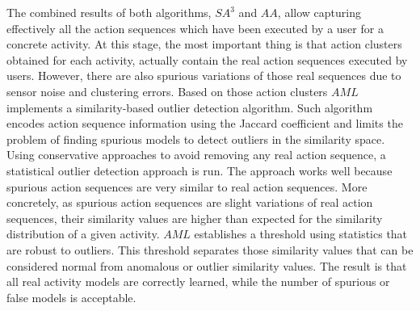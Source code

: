 The combined results of both algorithms, $SA^3$ and $AA$, allow capturing effectively all the action sequences which have been executed by a user for a concrete activity. At this stage, the most important thing is that action clusters obtained for each activity, actually contain the real action sequences executed by users. However, there are also spurious variations of those real sequences due to sensor noise and clustering errors. Based on those action clusters $AML$ implements a similarity-based outlier detection algorithm. Such algorithm encodes action sequence information using the Jaccard coefficient and limits the problem of finding spurious models to detect outliers in the similarity space. Using conservative approaches to avoid removing any real action sequence, a statistical outlier detection approach is run. The approach works well because spurious action sequences are very similar to real action sequences. More concretely, as spurious action sequences are slight variations of real action sequences, their similarity values are higher than expected for the similarity distribution of a given activity. $AML$ establishes a threshold using statistics that are robust to outliers. This threshold separates those similarity values that can be considered normal from anomalous or outlier similarity values. The result is that all real activity models are correctly learned, while the number of spurious or false models is acceptable. 

